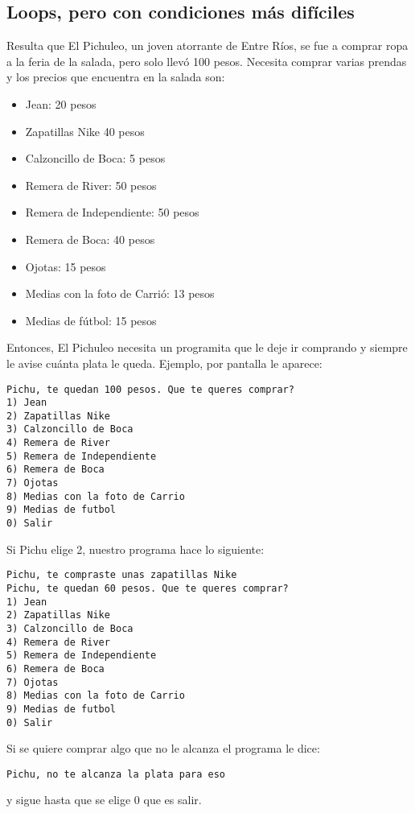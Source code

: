\subsection{Loops, pero con condiciones más difíciles}

Resulta que El Pichuleo, un joven atorrante de Entre Ríos, se fue a comprar ropa a la feria de la salada, pero solo llevó 100 pesos. Necesita comprar varias prendas y los precios que encuentra en la salada son:
\begin{itemize}
  \item Jean: 20 pesos
  \item Zapatillas Nike 40 pesos
  \item Calzoncillo de Boca: 5 pesos
  \item Remera de River: 50 pesos
  \item Remera de Independiente: 50 pesos
  \item Remera de Boca: 40 pesos
  \item Ojotas: 15 pesos
  \item Medias con la foto de Carrió: 13 pesos
  \item Medias de fútbol: 15 pesos
\end{itemize}

Entonces, El Pichuleo necesita un programita que le deje ir comprando y siempre le avise cuánta plata le queda. Ejemplo, por pantalla le aparece:

\begin{lstlisting}
Pichu, te quedan 100 pesos. Que te queres comprar?
1) Jean
2) Zapatillas Nike
3) Calzoncillo de Boca
4) Remera de River
5) Remera de Independiente
6) Remera de Boca
7) Ojotas 
8) Medias con la foto de Carrio
9) Medias de futbol
0) Salir
\end{lstlisting}
Si Pichu elige 2, nuestro programa hace lo siguiente:
\begin{lstlisting}
Pichu, te compraste unas zapatillas Nike
Pichu, te quedan 60 pesos. Que te queres comprar?
1) Jean
2) Zapatillas Nike
3) Calzoncillo de Boca
4) Remera de River
5) Remera de Independiente
6) Remera de Boca
7) Ojotas 
8) Medias con la foto de Carrio
9) Medias de futbol
0) Salir
\end{lstlisting}

Si se quiere comprar algo que no le alcanza el programa le dice:
\begin{lstlisting}
Pichu, no te alcanza la plata para eso
\end{lstlisting}
y sigue hasta que se elige 0 que es salir.